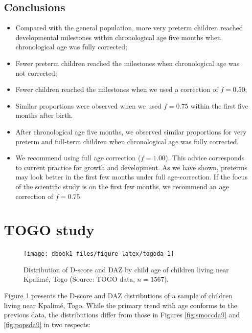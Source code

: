 \documentclass[
]{book}
\begin{document}
\hypertarget{conclusions}{%
\subsection{Conclusions}\label{conclusions}}

\begin{itemize}
\item
  Compared with the general population, more very preterm children reached developmental milestones within chronological age five months when chronological age was fully corrected;
\item
  Fewer preterm children reached the milestones when chronological age was not corrected;
\item
  Fewer children reached the milestones when we used a correction of \(f = 0.50\);
\item
  Similar proportions were observed when we used \(f = 0.75\) within the first five months after birth.
\item
  After chronological age five months, we observed similar proportions for very preterm and full-term children when chronological age was fully corrected.
\item
  We recommend using full age correction (\(f = 1.00\)). This advice corresponds to current practice for growth and development. As we have shown, preterms may look better in the first few months under full age-correction. If the focus of the scientific study is on the first few months, we recommend an age correction of \(f = 0.75\).
\end{itemize}

\hypertarget{sec:togo}{%
\section{TOGO study}\label{sec:togo}}

\begin{figure}

{\centering \texttt{[image: dbook1\_files/figure-latex/togoda-1]} 

}

\caption{Distribution of D-score and DAZ by child age of children living near Kpalimé, Togo (Source: TOGO data, \(n = 1567\)).}\label{fig:togoda}
\end{figure}



Figure \ref{fig:togoda} presents the D-score and DAZ distributions of a sample of children living near Kpalimé, Togo. While the primary trend with age conforms to the previous data, the distributions differ from those in Figures \ref{fig:smoccda9} and \ref{fig:popsda9} in two respects:
\end{document}
